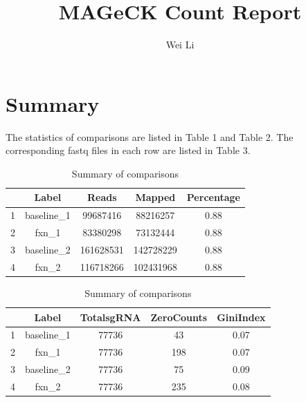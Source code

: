 \documentclass{article}
\begin{document}

\title{MAGeCK Count Report}
\author{Wei Li}

\maketitle


\tableofcontents

\section{Summary}



The statistics of comparisons are listed in Table 1 and Table 2.
The corresponding fastq files in each row are listed in Table 3.

\begin{table}[ht]
\centering
\begin{tabular}{ccccc}
  \hline
 & Label & Reads & Mapped & Percentage \\ 
  \hline
1 & baseline\_1 & 99687416 & 88216257 & 0.88 \\ 
  2 & fxn\_1 & 83380298 & 73132444 & 0.88 \\ 
  3 & baseline\_2 & 161628531 & 142728229 & 0.88 \\ 
  4 & fxn\_2 & 116718266 & 102431968 & 0.88 \\ 
   \hline
\end{tabular}
\caption{Summary of comparisons} 
\label{tab:one}
\end{table}
\begin{table}[ht]
\centering
\begin{tabular}{ccccc}
  \hline
 & Label & TotalsgRNA & ZeroCounts & GiniIndex \\ 
  \hline
1 & baseline\_1 & 77736 & 43 & 0.07 \\ 
  2 & fxn\_1 & 77736 & 198 & 0.07 \\ 
  3 & baseline\_2 & 77736 & 75 & 0.09 \\ 
  4 & fxn\_2 & 77736 & 235 & 0.08 \\ 
   \hline
\end{tabular}
\caption{Summary of comparisons} 
\label{tab:two}
\end{table}
\end{document}

